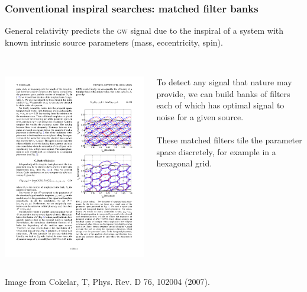 \documentclass{beamer}
\begin{document}
\begin{frame}
	\frametitle{Conventional inspiral searches: matched filter banks}
	General relativity predicts the \textsc{gw} signal due to the inspiral of a system with known intrinsic source parameters (mass, eccentricity, spin).
	\\~\\

	\begin{columns}
		\begin{column}{0.5\textwidth}
			\includegraphics[width=\textwidth]{figures/hexgrid}
		\end{column}
		\begin{column}{0.5\textwidth}
			To detect any signal that nature may provide, we can build banks of filters each of which has optimal signal to noise for a given source. \\~\\

			These matched filters tile the parameter space discretely, for example in a hexagonal grid. \\~\\~\\~\\
		\end{column}
	\end{columns}
	\begin{flushleft}
		\scriptsize{Image from Cokelar, T, Phys. Rev. D 76, 102004 (2007).}
	\end{flushleft}
\end{frame}
\end{document}
